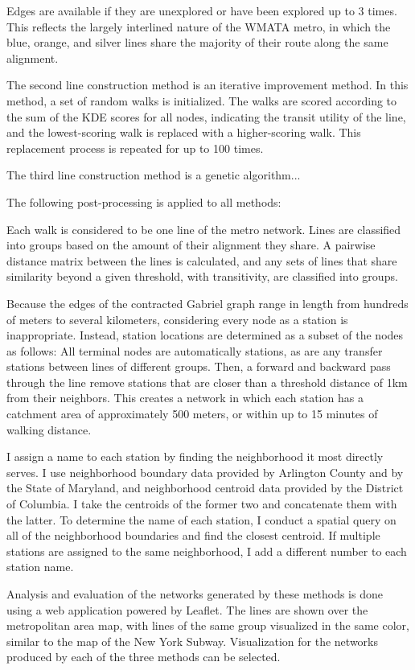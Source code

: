\documentclass[manuscript,screen,review]{acmart}
\begin{document}
Edges are available if they are unexplored or have been explored up to 3 times. This reflects the largely interlined nature of the WMATA metro, in which the blue, orange, and silver lines share the majority of their route along the same alignment. 

The second line construction method is an iterative improvement method. In this method, a set of random walks is initialized. The walks are scored according to the sum of the KDE scores for all nodes, indicating the transit utility of the line, and the lowest-scoring walk is replaced with a higher-scoring walk. This replacement process is repeated for up to 100 times.

The third line construction method is a genetic algorithm...

The following post-processing is applied to all methods:

Each walk is considered to be one line of the metro network. Lines are classified into groups based on the amount of their alignment they share. A pairwise distance matrix between the lines is calculated, and any sets of lines that share similarity beyond a given threshold, with transitivity, are classified into groups. 

Because the edges of the contracted Gabriel graph range in length from hundreds of meters to several kilometers, considering every node as a station is inappropriate. Instead, station locations are determined as a subset of the nodes as follows: All terminal nodes are automatically stations, as are any transfer stations between lines of different groups. Then, a forward and backward pass through the line remove stations that are closer than a threshold distance of 1km from their neighbors. This creates a network in which each station has a catchment area of approximately 500 meters, or within up to 15 minutes of walking distance.

I assign a name to each station by finding the neighborhood it most directly serves. I use neighborhood boundary data provided by Arlington County and by the State of Maryland, and neighborhood centroid data provided by the District of Columbia. I take the centroids of the former two and concatenate them with the latter. To determine the name of each station, I conduct a spatial query on all of the neighborhood boundaries and find the closest centroid. If multiple stations are assigned to the same neighborhood, I add a different number to each station name. 

Analysis and evaluation of the networks generated by these methods is done using a web application powered by Leaflet. The lines are shown over the metropolitan area map, with lines of the same group visualized in the same color, similar to the map of the New York Subway. Visualization for the networks produced by each of the three methods can be selected.
\end{document}

